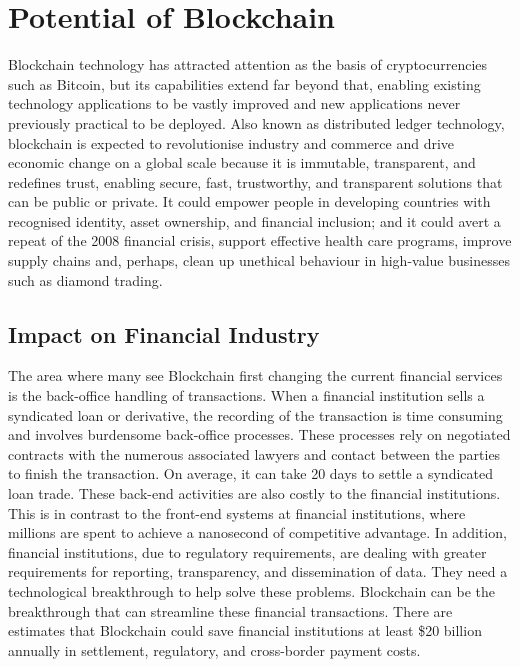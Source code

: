 \section{Potential of Blockchain}
Blockchain technology has attracted attention as the basis of cryptocurrencies such as Bitcoin, but its capabilities extend far beyond that, enabling existing technology applications to be vastly improved and new applications never previously practical to be deployed. Also known as distributed ledger technology, blockchain is expected to revolutionise industry and commerce and drive economic change on a global scale because it is immutable, transparent, and redefines trust, enabling secure, fast, trustworthy, and transparent solutions that can be public or private. It could empower people in developing countries with recognised identity, asset ownership, and financial inclusion; and it could avert a repeat of the 2008 financial crisis, support effective health care programs, improve supply chains and, perhaps, clean up unethical behaviour in high-value businesses such as diamond trading.\cite{Underwood2016BlockchainBitcoin}

\subsection{Impact on Financial Industry}
The area where many see Blockchain first changing the current financial services is the back-office handling of transactions. When a financial institution sells a syndicated loan or derivative, the recording of the transaction is time consuming and involves burdensome back-office processes. These processes rely on negotiated contracts with the numerous associated lawyers and contact between the parties to finish the transaction. On average, it can take 20 days to settle a syndicated loan trade. These back-end activities are also costly to the financial institutions. This is in contrast to the front-end systems at financial institutions, where millions are spent to achieve a nanosecond of competitive advantage. In addition, financial institutions, due to regulatory requirements, are dealing with greater requirements for reporting, transparency, and dissemination of data. They need a technological breakthrough to help solve these problems. Blockchain can be the breakthrough that can streamline these financial transactions. There are estimates that Blockchain could save financial institutions at least \$20 billion annually in settlement, regulatory, and cross-border payment costs.\cite{Fanning2016BlockchainServices}

